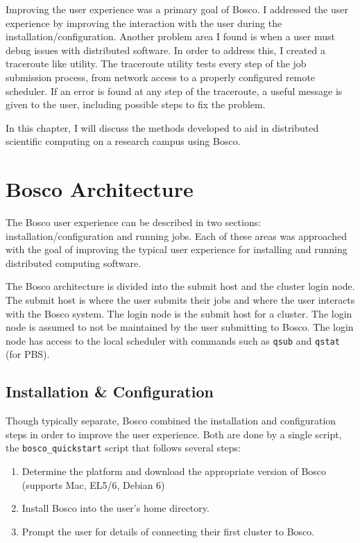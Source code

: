 Improving the user experience was a primary goal of Bosco.  I addressed the user experience by improving the interaction with the user during the installation/configuration.  Another problem area I found is when a user must debug issues with distributed software.  In order to address this, I created a traceroute \cite{mao2003towards} like utility.  The traceroute utility tests every step of the job submission process, from network access to a properly configured remote scheduler.  If an error is found at any step of the traceroute, a useful message is given to the user, including possible steps to fix the problem.




In this chapter, I will discuss the methods developed to aid in distributed scientific computing on a research campus using Bosco.  

\section{Bosco Architecture}
\label{sec:boscoarch}

% 

The Bosco user experience can be described in two sections: installation/configuration and running jobs.  Each of these areas was approached with the goal of improving the typical user experience for installing and running distributed computing software.

The Bosco architecture is divided into the submit host and the cluster login node.  The submit host is where the user submits their jobs and where the user interacts with the Bosco system.  The login node is the submit host for a cluster.  The login node is assumed to not be maintained by the user submitting to Bosco.  The login node has access to the local scheduler with commands such as \texttt{qsub} and \texttt{qstat} (for PBS).  

\subsection{Installation \& Configuration}
Though typically separate, Bosco combined the installation and configuration steps in order to improve the user experience.  Both are done by a single script, the \texttt{bosco\_quickstart} script that follows several steps:

\begin{enumerate}
\item Determine the platform and download the appropriate version of Bosco (supports Mac, EL5/6, Debian 6)
\item Install Bosco into the user's home directory.
\item Prompt the user for details of connecting their first cluster to Bosco.
\end{enumerate}

